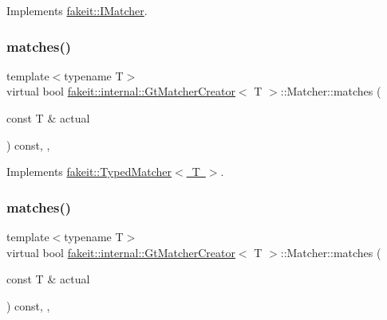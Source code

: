 Implements \mbox{\hyperlink{structfakeit_1_1IMatcher_a409d414a042236dc5e05e241dfd24a67}{fakeit\+::\+I\+Matcher}}.

\mbox{\label{structfakeit_1_1internal_1_1GtMatcherCreator_1_1Matcher_a94c09643f70784105c584eb3341a0cef}} 
\subsubsection{\texorpdfstring{matches()}{matches()}\hspace{0.1cm}{\footnotesize\ttfamily [1/9]}}
{\footnotesize\ttfamily template$<$typename T$>$ \\
virtual bool \mbox{\hyperlink{structfakeit_1_1internal_1_1GtMatcherCreator}{fakeit\+::internal\+::\+Gt\+Matcher\+Creator}}$<$ T $>$\+::Matcher\+::matches (\begin{DoxyParamCaption}\item[{const T \&}]{actual }\end{DoxyParamCaption}) const\hspace{0.3cm}{\ttfamily [inline]}, {\ttfamily [override]}, {\ttfamily [virtual]}}



Implements \mbox{\hyperlink{structfakeit_1_1TypedMatcher_ac553bb6ac7c98a489c92fa6ace0f2e2b}{fakeit\+::\+Typed\+Matcher$<$ T $>$}}.

\mbox{\label{structfakeit_1_1internal_1_1GtMatcherCreator_1_1Matcher_a94c09643f70784105c584eb3341a0cef}} 
\subsubsection{\texorpdfstring{matches()}{matches()}\hspace{0.1cm}{\footnotesize\ttfamily [2/9]}}
{\footnotesize\ttfamily template$<$typename T$>$ \\
virtual bool \mbox{\hyperlink{structfakeit_1_1internal_1_1GtMatcherCreator}{fakeit\+::internal\+::\+Gt\+Matcher\+Creator}}$<$ T $>$\+::Matcher\+::matches (\begin{DoxyParamCaption}\item[{const T \&}]{actual }\end{DoxyParamCaption}) const\hspace{0.3cm}{\ttfamily [inline]}, {\ttfamily [override]}, {\ttfamily [virtual]}}



